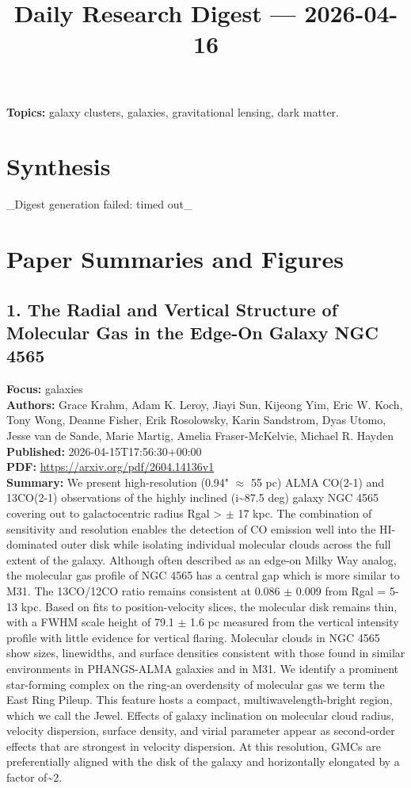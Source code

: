 \documentclass[11pt]{article}
\begin{document}
\title{Daily Research Digest --- 2026-04-16}
\author{}
\date{}
\maketitle
\textbf{Topics:} galaxy clusters, galaxies, gravitational lensing, dark matter.
\section*{Synthesis}
\_Digest generation failed: timed out\_
\newpage
\section*{Paper Summaries and Figures}
\subsection*{1. The Radial and Vertical Structure of Molecular Gas in the Edge-On Galaxy NGC 4565}
\textbf{Focus:} galaxies\\
\textbf{Authors:} Grace Krahm, Adam K. Leroy, Jiayi Sun, Kijeong Yim, Eric W. Koch, Tony Wong, Deanne Fisher, Erik Rosolowsky, Karin Sandstrom, Dyas Utomo, Jesse van de Sande, Marie Martig, Amelia Fraser-McKelvie, Michael R. Hayden\\
\textbf{Published:} 2026-04-15T17:56:30+00:00\\
\textbf{PDF:} \href{https://arxiv.org/pdf/2604.14136v1}{https://arxiv.org/pdf/2604.14136v1}\\
\textbf{Summary:}
We present high-resolution (0.94" $\approx$ 55 pc) ALMA CO(2-1) and 13CO(2-1) observations of the highly inclined (i\textasciitilde{}87.5 deg) galaxy NGC 4565 covering out to galactocentric radius Rgal > $\pm$ 17 kpc. The combination of sensitivity and resolution enables the detection of CO emission well into the HI-dominated outer disk while isolating individual molecular clouds across the full extent of the galaxy. Although often described as an edge-on Milky Way analog, the molecular gas profile of NGC 4565 has a central gap which is more similar to M31. The 13CO/12CO ratio remains consistent at 0.086 $\pm$ 0.009 from Rgal = 5-13 kpc. Based on fits to position-velocity slices, the molecular disk remains thin, with a FWHM scale height of 79.1 $\pm$ 1.6 pc measured from the vertical intensity profile with little evidence for vertical flaring. Molecular clouds in NGC 4565 show sizes, linewidths, and surface densities consistent with those found in similar environments in PHANGS-ALMA galaxies and in M31. We identify a prominent star-forming complex on the ring-an overdensity of molecular gas we term the East Ring Pileup. This feature hosts a compact, multiwavelength-bright region, which we call the Jewel. Effects of galaxy inclination on molecular cloud radius, velocity dispersion, surface density, and virial parameter appear as second-order effects that are strongest in velocity dispersion. At this resolution, GMCs are preferentially aligned with the disk of the galaxy and horizontally elongated by a factor of\textasciitilde{}2.
\end{document}
